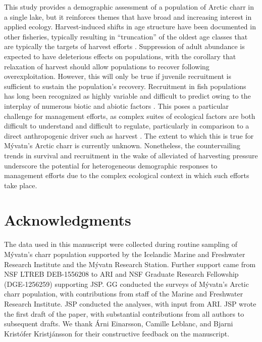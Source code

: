 \documentclass[11pt]{article}
\begin{document}
This study provides a demographic assessment of a population of Arctic charr in a single lake,
but it reinforces themes that have broad and increasing interest in applied ecology.
Harvest-induced shifts in age structure have been documented in other fisheries,
typically resulting in ``truncation'' of the oldest age classes 
that are typically the targets of harvest efforts
\citep{hsieh2010fishing}.
Suppression of adult abundance is expected to have deleterious effects on populations,
with the corollary that relaxation of harvest should allow populations 
to recover following overexploitation.
However, this will only be true if juvenile recruitment is sufficient 
to sustain the population's recovery.
Recruitment in fish populations 
has long been recognized as highly variable and difficult to predict
owing to the interplay of numerous biotic and abiotic factors 
\citep{dixon1999episodic, houde2008emerging, ludsin2014physical}.
This poses a particular challenge for management efforts, 
as complex suites of ecological factors are both difficult to understand 
and difficult to regulate, 
particularly in comparison to a direct anthropogenic driver such as harvest
\citep{beamish1999taking, link2002does}.
The extent to which this is true for M\'{y}vatn's Arctic charr is currently unknown.
Nonetheless, 
the countervailing trends in survival and recruitment 
in the wake of alleviated of harvesting pressure
underscore the potential for heterogeneous demographic responses to management efforts
due to the complex ecological context in which such efforts take place.






\section*{Acknowledgments} 

The data used in this manuscript were collected during routine sampling 
of M\'{y}vatn’s charr population supported by 
the Icelandic Marine and Freshwater Research Institute 
and the M\'{y}vatn Research Station. 
Further support came from NSF LTREB DEB-1556208 to ARI and 
NSF Graduate Research Fellowship (DGE-1256259) supporting JSP.
GG conducted the surveys of M\'{y}vatn’s Arctic charr population,
with contributions from staff of the Marine and Freshwater Research Institute. 
JSP conducted the analyses, 
with input from ARI. 
JSP wrote the first draft of the paper, 
with substantial contributions from all authors to subsequent drafts.
We thank \'{A}rni Einarsson, Camille Leblanc, and Bjarni Krist\'{o}fer Kristj\'{a}nsson
for their constructive feedback on the manuscript.
\end{document}
